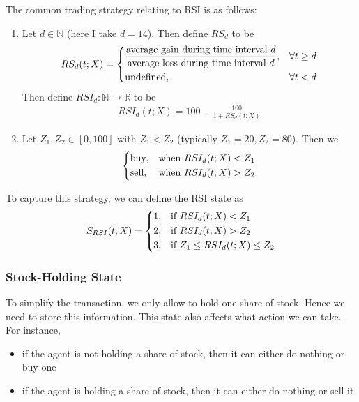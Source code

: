 \documentclass[11pt,a4paper]{article}
\numberwithin{equation}{section}
\newcommand{\R}{\mathbb{R}}
\newcommand{\N}{\mathbb{N}}
\begin{document}
The common trading strategy relating to RSI is as follows:
\begin{enumerate}
  \item Let $d \in \N$ (here I take $d = 14$). Then define $RS_d$ to be
        \begin{align}
          RS_d (t; X) =
          \begin{dcases}
            \frac{\text{average gain during time interval $d$}}{\text{average loss during time interval $d$}}, & \forall t \geq d \\
            \text{undefined},                                                                                  & \forall t < d
          \end{dcases}
        \end{align}
        Then define $RSI_d: \N \to \R$ to be
        \begin{align}
          RSI_d (t; X) = 100 - \frac{100}{1 + RS_d (t; X)}
        \end{align}
  \item Let $Z_1, Z_2 \in [0, 100]$ with $Z_1 < Z_2$ (typically $Z_1 = 20, Z_2 = 80$). Then we
        \begin{align}
          \begin{dcases}
            \text{buy},  & \text{when $RSI_d (t; X) < Z_1$} \\
            \text{sell}, & \text{when $RSI_d (t; X) > Z_2$}
          \end{dcases}
        \end{align}
\end{enumerate}

To capture this strategy, we can define the RSI state as
\begin{align}
  S_{RSI} (t; X) =
  \begin{dcases}
    1, & \text{if $RSI_d (t; X) < Z_1$}              \\
    2, & \text{if $RSI_d (t; X) > Z_2$}              \\
    3, & \text{if $Z_1 \leq RSI_d (t; X) \leq  Z_2$} \\
  \end{dcases}
\end{align}

\subsubsection{Stock-Holding State}

To simplify the transaction, we only allow to hold one share of stock. Hence we need to store this information. This state also affects what action we can take. For instance,
\begin{itemize}
  \item if the agent is not holding a share of stock, then it can either do nothing or buy one
  \item if the agent is holding a share of stock, then it can either do nothing or sell it
\end{itemize}
\end{document}
